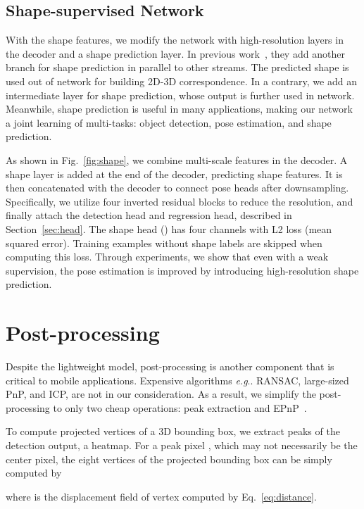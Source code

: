 \documentclass[runningheads]{llncs}
\makeatletter
\DeclareRobustCommand\onedot{\futurelet\@let@token\@onedot}
\def\@onedot{\ifx\@let@token.\else.\null\fi\xspace}
\def\eg{\emph{e.g}\onedot} \def\Eg{\emph{E.g}\onedot}
\makeatother
\begin{document}
\subsection{Shape-supervised Network}
With the shape features, we modify the network with high-resolution layers in the decoder and a shape prediction layer. In previous work~\cite{Hu_2019_Segmentation,Wang_2019_NOCS,Li_2019_CDPN,Park_2019_Pix2Pose}, they add another branch for shape prediction in parallel to other streams. The predicted shape is used out of network for building 2D-3D correspondence. In a contrary, we add an intermediate layer for shape prediction, whose output is further used in network. Meanwhile, shape prediction is useful in many applications, making our network a joint learning of multi-tasks: object detection, pose estimation, and shape prediction.

As shown in Fig.~\ref{fig:shape}, we combine multi-scale features in the decoder. A shape layer is added at the end of the decoder, predicting shape features. It is then concatenated with the decoder to connect pose heads after downsampling. Specifically, we utilize four inverted residual blocks to reduce the resolution, and finally attach the detection head and regression head, described in Section~\ref{sec:head}. The shape head () has four channels with L2 loss (mean squared error). Training examples without shape labels are skipped when computing this loss. Through experiments, we show that even with a weak supervision, the pose estimation is improved by introducing high-resolution shape prediction.

\section{Post-processing}\label{sec:post}
Despite the lightweight model, post-processing is another component that is critical to mobile applications. Expensive algorithms \eg RANSAC, large-sized PnP, and ICP, are not in our consideration. As a result, we simplify the post-processing to only two cheap operations: peak extraction and EPnP~\cite{Lepetit_2009_EPnP}.

To compute projected vertices of a 3D bounding box, we extract peaks of the detection output, a  heatmap. For a peak pixel , which may not necessarily be the center pixel, the eight vertices  of the projected bounding box can be simply computed by

where  is the displacement field of vertex  computed by Eq.~\ref{eq:distance}.
\end{document}
